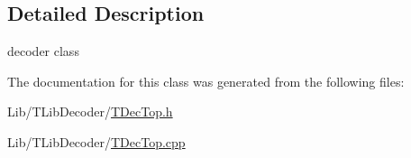 \subsection{Detailed Description}
decoder class 

The documentation for this class was generated from the following files\+:\begin{DoxyCompactItemize}
\item 
Lib/\+T\+Lib\+Decoder/\hyperlink{_t_dec_top_8h}{T\+Dec\+Top.\+h}\item 
Lib/\+T\+Lib\+Decoder/\hyperlink{_t_dec_top_8cpp}{T\+Dec\+Top.\+cpp}\end{DoxyCompactItemize}
